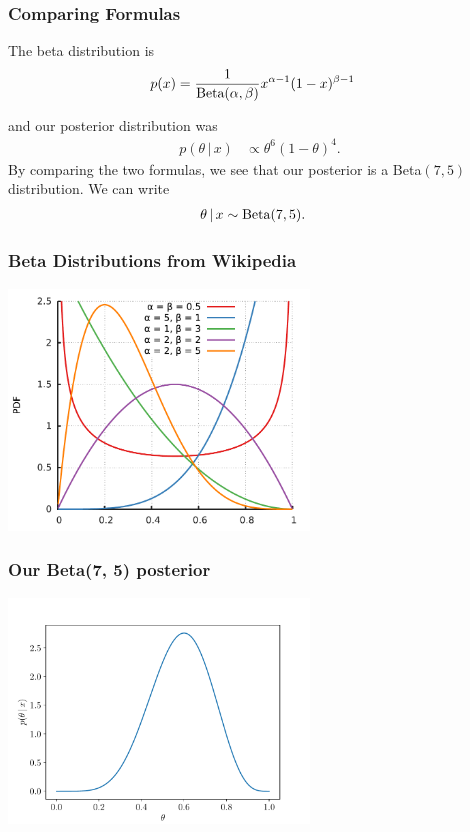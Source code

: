 \documentclass{beamer}
\newcommand{\given}{\,|\,}
\begin{document}
\begin{frame}
\frametitle{Comparing Formulas}

The beta distribution is
\begin{align}
p(x) &= \frac{1}{\textnormal{Beta}(\alpha, \beta)}
            x^{\alpha - 1}(1-x)^{\beta - 1}
\end{align}

and our posterior distribution was
\begin{align}
p(\theta \given x) &\propto \theta^6(1-\theta)^4.
\end{align}\pause
By comparing the two formulas, we see that our posterior is
a Beta$(7, 5)$ distribution. We can write
\begin{align}
\theta \given x &\sim \textnormal{Beta}(7, 5).
\end{align}

\end{frame}

\begin{frame}
\frametitle{Beta Distributions from Wikipedia}

\begin{center}
\includegraphics[width=0.6\textwidth]{images/betas.pdf}
\end{center}

\end{frame}

\begin{frame}
\frametitle{Our Beta(7, 5) posterior}

\begin{center}
\includegraphics[width=0.6\textwidth]{images/beta_posterior.pdf}
\end{center}

\end{frame}
\end{document}
